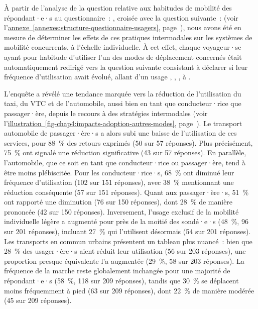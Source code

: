 \begin{refsegment}
À partir de l'analyse de la question relative aux habitudes de mobilité des répondant·e·s au questionnaire~: , croisée avec la question suivante~:  (voir l'\hyperref[annexes:structure-questionnaire-usagers]{annexe~\ref{annexes:structure-questionnaire-usagers}}, page~\pageref{annexes:structure-questionnaire-usagers}), nous avons été en mesure de déterminer les effets de ces pratiques intermodales sur les systèmes de mobilité concurrents, à l'échelle individuelle. À cet effet, chaque voyageur·se ayant pour habitude d'utiliser l'un des modes de déplacement concernés était automatiquement redirigé vers la question suivante consistant à déclarer si leur fréquence d'utilisation avait évolué, allant d'un usage , , ,  à .

L'enquête a révélé une tendance marquée vers la réduction de l'utilisation du taxi, du \acrshort{VTC} et de l'automobile, aussi bien en tant que conducteur·rice que passager·ère, depuis le recours à des stratégies intermodales (voir l'\hyperref[fig-chap4:impacts-adoption-autres-modes]{illustration~\ref{fig-chap4:impacts-adoption-autres-modes}}, page~\pageref{fig-chap4:impacts-adoption-autres-modes}). Le transport automobile de passager·ère·s a alors subi une baisse de l'utilisation de ces services, pour 88~\% des retours exprimés (50 sur 57 réponses). Plus précisément, 75~\% ont signalé une réduction significative (43 sur 57 réponses). En parallèle, l'automobile, que ce soit en tant que conducteur·rice ou passager·ère, tend à être moins plébiscitée. Pour les conducteur·rice·s, 68~\% ont diminué leur fréquence d'utilisation (102 sur 151 réponses), avec 38~\% mentionnant une réduction conséquente (57 sur 151 réponses). Quant aux passager·ère·s, 51~\% ont rapporté une diminution (76 sur 150 réponses), dont 28~\% de manière prononcée (42 sur 150 réponses). Inversement, l'usage exclusif de la mobilité individuelle légère a augmenté pour près de la moitié des sondé·e·s (48~\%, 96 sur 201 réponses), incluant 27~\% qui l'utilisent désormais  (54 sur 201 réponses). Les transports en commun urbains présentent un tableau plus nuancé~: bien que 28~\% des usager·ère·s aient réduit leur utilisation (56 sur 203 réponses), une proportion presque équivalente l'a augmentée (29~\%, 58 sur 203 réponses). La fréquence de la marche reste globalement inchangée pour une majorité de répondant·e·s (58~\%, 118 sur 209 réponses), tandis que 30~\% se déplacent moins fréquemment à pied (63 sur 209 réponses), dont 22~\% de manière modérée (45 sur 209 réponses).%


\end{refsegment}
